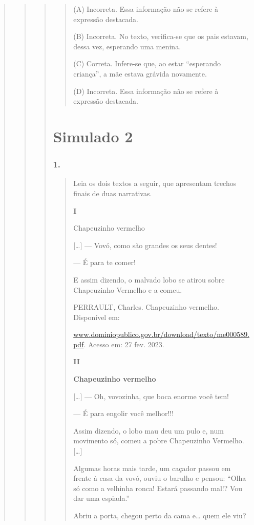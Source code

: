 \begin{quote}
\begin{quote}
\begin{quote}
\begin{quote}
(A) Incorreta. Essa informação não se refere à expressão destacada.

(B) Incorreta. No texto, verifica-se que os pais estavam, dessa vez,
esperando uma menina.

(C) Correta. Infere-se que, ao estar ``esperando criança'', a mãe estava
grávida novamente.

(D) Incorreta. Essa informação não se refere à expressão destacada.
\end{quote}

\section{Simulado 2}\label{simulado-2}

\subsubsection{1. }\label{section-84}

\begin{quote}
Leia os dois textos a seguir, que apresentam trechos finais de duas
narrativas.

\textbf{I}

Chapeuzinho vermelho

{[}\ldots{}{]} --- Vovó, como são grandes os seus dentes!

--- É para te comer!

E assim dizendo, o malvado lobo se atirou sobre Chapeuzinho Vermelho e a
comeu.

PERRAULT, Charles. Chapeuzinho vermelho. Disponível em:

\href{http://www.dominiopublico.gov.br/download/texto/me000589.pdf}{www.dominiopublico.gov.br/download/texto/me000589.pdf}.
Acesso em: 27 fev. 2023.

\textbf{II}

\textbf{Chapeuzinho vermelho}

{[}\ldots{}{]} --- Oh, vovozinha, que boca enorme você tem!

--- É para engolir você melhor!!!

Assim dizendo, o lobo mau deu um pulo e, num movimento só, comeu a pobre
Chapeuzinho Vermelho. {[}\ldots{}{]}

Algumas horas mais tarde, um caçador passou em frente à casa da vovó,
ouviu o barulho e pensou: ``Olha só como a velhinha ronca! Estará
passando mal!? Vou dar uma espiada.''

Abriu a porta, chegou perto da cama e\ldots{} quem ele viu?


\end{quote}
\end{quote}
\end{quote}
\end{quote}
